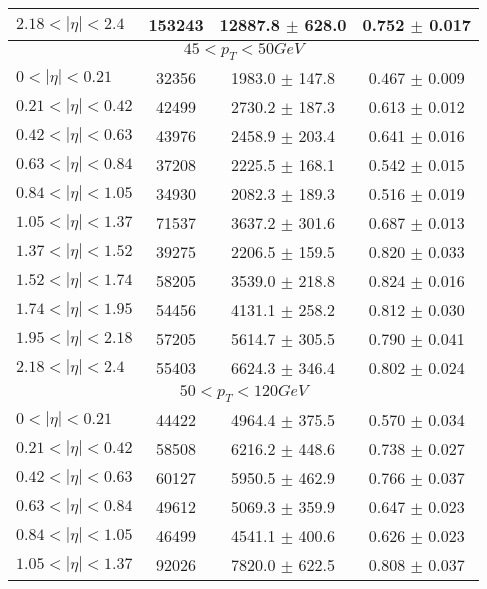 \begin{tabular}{lccc}
$2.18 < |\eta| <2.4$           & 153243     & 12887.8    $\pm$ 628.0 & 0.752      $\pm$ 0.017 \\
\hline
\multicolumn{4}{c}{$45 < p_{T} < 50 GeV$} \\
\hline
$0 < |\eta| <0.21$             & 32356      & 1983.0     $\pm$ 147.8 & 0.467      $\pm$ 0.009 \\
$0.21 < |\eta| <0.42$          & 42499      & 2730.2     $\pm$ 187.3 & 0.613      $\pm$ 0.012 \\
$0.42 < |\eta| <0.63$          & 43976      & 2458.9     $\pm$ 203.4 & 0.641      $\pm$ 0.016 \\
$0.63 < |\eta| <0.84$          & 37208      & 2225.5     $\pm$ 168.1 & 0.542      $\pm$ 0.015 \\
$0.84 < |\eta| <1.05$          & 34930      & 2082.3     $\pm$ 189.3 & 0.516      $\pm$ 0.019 \\
$1.05 < |\eta| <1.37$          & 71537      & 3637.2     $\pm$ 301.6 & 0.687      $\pm$ 0.013 \\
$1.37 < |\eta| <1.52$          & 39275      & 2206.5     $\pm$ 159.5 & 0.820      $\pm$ 0.033 \\
$1.52 < |\eta| <1.74$          & 58205      & 3539.0     $\pm$ 218.8 & 0.824      $\pm$ 0.016 \\
$1.74 < |\eta| <1.95$          & 54456      & 4131.1     $\pm$ 258.2 & 0.812      $\pm$ 0.030 \\
$1.95 < |\eta| <2.18$          & 57205      & 5614.7     $\pm$ 305.5 & 0.790      $\pm$ 0.041 \\
$2.18 < |\eta| <2.4$           & 55403      & 6624.3     $\pm$ 346.4 & 0.802      $\pm$ 0.024 \\
\hline
\multicolumn{4}{c}{$50 < p_{T} < 120 GeV$} \\
\hline
$0 < |\eta| <0.21$             & 44422      & 4964.4     $\pm$ 375.5 & 0.570      $\pm$ 0.034 \\
$0.21 < |\eta| <0.42$          & 58508      & 6216.2     $\pm$ 448.6 & 0.738      $\pm$ 0.027 \\
$0.42 < |\eta| <0.63$          & 60127      & 5950.5     $\pm$ 462.9 & 0.766      $\pm$ 0.037 \\
$0.63 < |\eta| <0.84$          & 49612      & 5069.3     $\pm$ 359.9 & 0.647      $\pm$ 0.023 \\
$0.84 < |\eta| <1.05$          & 46499      & 4541.1     $\pm$ 400.6 & 0.626      $\pm$ 0.023 \\
$1.05 < |\eta| <1.37$          & 92026      & 7820.0     $\pm$ 622.5 & 0.808      $\pm$ 0.037 \\

\end{tabular}
